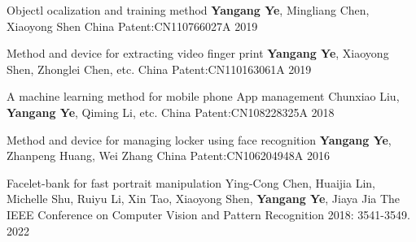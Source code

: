 

\begin{cvhonors}

  \cvhonor
    {Objectl ocalization and training method} %
    {\textbf{Yangang Ye}, Mingliang Chen, Xiaoyong Shen} %
    {China Patent:CN110766027A} %
    {2019} %

  \cvhonor
    {Method and device for extracting video finger print} %
    {\textbf{Yangang Ye}, Xiaoyong Shen, Zhonglei Chen, etc.} %
    {China Patent:CN110163061A} %
    {2019} %

  \cvhonor
    {A machine learning method for mobile phone App management} %
    {Chunxiao Liu, \textbf{Yangang Ye}, Qiming Li, etc.} %
    {China Patent:CN108228325A} %
    {2018} %

  \cvhonor
    {Method and device for managing locker using face recognition} %
    {\textbf{Yangang Ye}, Zhanpeng Huang, Wei Zhang} %
    {China Patent:CN106204948A} %
    {2016} %

  \cvhonor
    {Facelet-bank for fast portrait manipulation} %
    {Ying-Cong Chen, Huaijia Lin, Michelle Shu, Ruiyu Li, Xin Tao, Xiaoyong Shen, \textbf{Yangang Ye}, Jiaya Jia} %
    {The IEEE Conference on Computer Vision and Pattern Recognition 2018: 3541-3549.} %
    {2022} %

\end{cvhonors}
